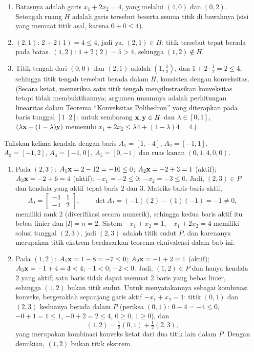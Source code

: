 \begin{enumerate}
\item Batasnya adalah garis $x_1 + 2x_2 = 4$, yang melalui $(4, 0)$ dan $(0, 2)$. Setengah ruang $H$ adalah garis tersebut beserta semua titik di bawahnya (sisi yang memuat titik asal, karena $0 + 0 \leq 4$).
\item $(2,1)$: $2 + 2(1) = 4 \leq 4$, jadi ya, $(2,1) \in H$; titik tersebut tepat berada pada batas. $(1,2)$: $1 + 2(2) = 5 > 4$, sehingga $(1,2) \notin H$.
\item Titik tengah dari $(0,0)$ dan $(2,1)$ adalah $(1, \tfrac12)$, dan $1 + 2\cdot\tfrac12 = 2 \leq 4$, sehingga titik tengah tersebut berada dalam $H$, konsisten dengan konveksitas. (Secara ketat, memeriksa satu titik tengah mengilustrasikan konveksitas tetapi tidak membuktikannya; argumen umumnya adalah perhitungan linearitas dalam Teorema “Konveksitas Polihedron” yang diterapkan pada baris tunggal $[1\;\; 2]$: untuk sembarang $\mathbf{x}, \mathbf{y} \in H$ dan $\lambda \in [0,1]$, $(\lambda\mathbf{x} + (1-\lambda)\mathbf{y})$ memenuhi $x_1 + 2x_2 \leq \lambda 4 + (1-\lambda)4 = 4$.)
\end{enumerate}

Tuliskan kelima kendala dengan baris $A_1 = [1, -4]$, $A_2 = [-1, 1]$, $A_3 = [-1, 2]$, $A_4 = [-1, 0]$, $A_5 = [0, -1]$ dan ruas kanan $(0, 1, 4, 0, 0)$.
\begin{enumerate}
\item Pada $(2,3)$: $A_1\mathbf{x} = 2 - 12 = -10 \leq 0$; $A_2\mathbf{x} = -2 + 3 = 1$ (aktif); $A_3\mathbf{x} = -2 + 6 = 4$ (aktif); $-x_1 = -2 \leq 0$; $-x_2 = -3 \leq 0$. Jadi, $(2,3) \in P$ dan kendala yang aktif tepat baris $2$ dan $3$. Matriks baris-baris aktif,
\[
A_I = \begin{bmatrix} -1 & 1 \\ -1 & 2 \end{bmatrix}, \qquad \det A_I = (-1)(2) - (1)(-1) = -1 \neq 0,
\]
memiliki rank $2$ (diverifikasi secara numerik), sehingga kedua baris aktif itu bebas linier dan $|I| = n = 2$. Sistem $-x_1 + x_2 = 1$, $-x_1 + 2x_2 = 4$ memiliki solusi tunggal $(2,3)$, jadi $(2,3)$ adalah titik sudut $P$, dan karenanya merupakan titik ekstrem berdasarkan teorema ekuivalensi dalam bab ini.
\item Pada $(1,2)$: $A_1\mathbf{x} = 1 - 8 = -7 \leq 0$; $A_2\mathbf{x} = -1 + 2 = 1$ (aktif); $A_3\mathbf{x} = -1 + 4 = 3 < 4$; $-1 < 0$; $-2 < 0$. Jadi, $(1,2) \in P$ dan hanya kendala $2$ yang aktif; satu baris tidak dapat memuat $2$ baris yang bebas linier, sehingga $(1,2)$ bukan titik sudut. Untuk menyatakannya sebagai kombinasi konveks, bergeraklah sepanjang garis aktif $-x_1 + x_2 = 1$: titik $(0,1)$ dan $(2,3)$ keduanya berada dalam $P$ (periksa $(0,1)$: $0 - 4 = -4 \leq 0$, $-0+1 = 1 \leq 1$, $-0+2 = 2 \leq 4$, $0 \geq 0$, $1 \geq 0$), dan
\[
(1, 2) = \tfrac12 (0, 1) + \tfrac12 (2, 3),
\]
yang merupakan kombinasi konveks ketat dari dua titik lain dalam $P$. Dengan demikian, $(1,2)$ bukan titik ekstrem.
\end{enumerate}

